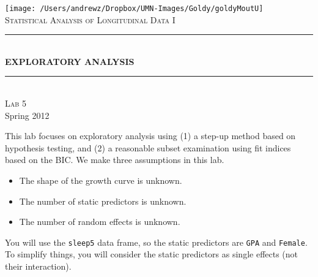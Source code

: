 \documentclass[]{article}
\title{}
\author{}
\date{}
\newcommand{\HRule}{\rule{\linewidth}{0.5mm}}
\begin{document}
\thispagestyle{empty}


\begin{titlepage}
\begin{center}
\texttt{[image: /Users/andrewz/Dropbox/UMN-Images/Goldy/goldyMoutU]}\\[1cm]    
\textsc{\LARGE Statistical Analysis of Longitudinal Data I}\\[1.5cm]
\HRule \\[.5cm]
{ \huge \bfseries EXPLORATORY ANALYSIS}\\[0.4cm]
\HRule \\[1.5cm]
\textsc{\Large Lab 5}\\[0.5cm]
\vfill
{\large Spring 2012}

\end{center}
\end{titlepage}

\thispagestyle{fancy}
\setlength{\textheight}{8.5in}


\noindent This lab focuses on exploratory analysis using (1) a step-up method based on hypothesis testing, and
(2) a reasonable subset examination using fit indices based on the BIC. We make three assumptions in this lab.

\begin{itemize}
\item The shape of the growth curve is unknown.
\item The number of static predictors is unknown.
\item The number of random effects is unknown.
\end{itemize}

You will use the \texttt{sleep5} data frame, so the static predictors are \texttt{GPA} and \texttt{Female}. To simplify things, you will consider the static predictors as single effects (not their interaction).\\
\linebreak
\end{document}
